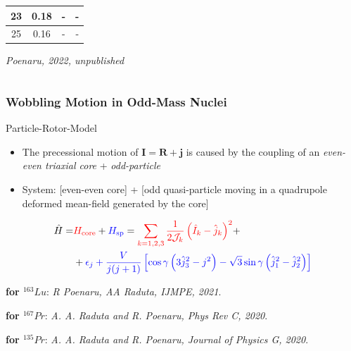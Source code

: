 \documentclass{beamer}
\begin{document}
\begin{frame}
\begin{columns}
\begin{column}{0.28\textwidth}
\begin{table}
{\begin{tabular}{|c|ccc|}
          23                   & \multicolumn{1}{c|}{0.18}       & \multicolumn{1}{c|}{-}           &  -            \\ \hline
          25                   & \multicolumn{1}{c|}{0.16}       & \multicolumn{1}{c|}{-}           &  -            \\ \hline
        \end{tabular}%
        }
      \end{table}
      \tiny{\emph{Poenaru, 2022, unpublished}}
      \end{column}
\end{columns}
\end{frame}

\begin{frame}
  \frametitle{Wobbling Motion in Odd-Mass Nuclei}
  \begin{block}{Particle-Rotor-Model}
    \begin{itemize}
      \item The precessional motion of $\mathbf{I}=\mathbf{R}+\mathbf{j}$ is caused by the coupling of an \emph{even-even triaxial core} + \emph{odd-particle}
      \item System: {\color{red}[even-even core]} + {\color{blue}[odd quasi-particle moving in a quadrupole deformed mean-field generated by the core]}
    \end{itemize}
  \end{block}
  {\small
  \begin{align}
    \hat{H}=&{\color{red}H_\text{core}}+{\color{blue}H_\text{sp}}={\color{red}\sum_{k=1,2,3}\frac{1}{2\mathcal{J}_k}\left(\hat{I}_k-\hat{j}_k\right)^2}+\nonumber\\
            &+{\color{blue}\epsilon_j+\frac{V}{j(j+1)}\left[\cos\gamma\left(3\hat{j}_3^2-j^2\right)-\sqrt{3}\sin\gamma\left(\hat{j}_1^2-\hat{j}_2^2\right)\right]}
  \end{align}}%
  \par{\tiny\textbf{for $^{163}Lu$}: \textit{R Poenaru, AA Raduta, IJMPE, 2021}.}
  \par{\tiny\textbf{for $^{167}Pr$}: \textit{A. A. Raduta and R. Poenaru, Phys Rev C, 2020}.}
  \par{\tiny\textbf{for $^{135}Pr$}: \textit{A. A. Raduta and R. Poenaru, Journal of Physics G, 2020}.}
\end{frame}
\end{document}
